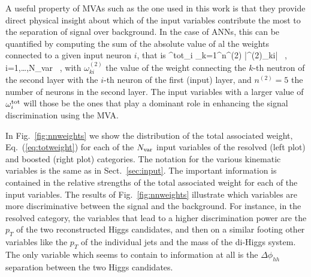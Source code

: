 A useful property of MVAs such as the one used in this work
is that they provide direct  physical insight about which of the
input variables contribute the most to the separation of
signal over background.
%
In the case of ANNs, this can be quantified by computing the sum
of the absolute value of al the weights connected to a given
input neuron $i$, that is
\be
\label{eq:totweight}
\omega^{\rm tot}_i \equiv \sum_{k=1}^{n^{(2)}} \Big|\omega^{(2)}_{ki}\Big| \, ,
\qquad i=1,\ldots,N_{\rm var} \, ,
\ee
with $\omega^{(2)}_{ki}$ the value of the weight connecting
the $k$-th neutron of the second layer with the $i$-th neuron of
the first (input) layer, and $n^{(2)}=5$ the number of
neurons in the second layer.
%
The input variables with a larger value of $\omega^{\rm tot}_i$ will those
be the ones that play a dominant role in enhancing the signal
discrimination using the MVA.

%
In Fig.~\ref{fig:nnweights} we show
the distribution of the total associated weight,
Eq.~(\ref{eq:totweight}) for each of the $N_{\rm var}$ input
variables of the resolved (left plot) and boosted (right plot) categories.
%
The notation for the various kinematic variables is the same
as in Sect.~\ref{sec:input}.
%
The important information
is contained in the relative strengths of the total associated weight
for each of the input variables.
%
The results of Fig.~\ref{fig:nnweights} illustrate which variables
are more discriminative between the signal and the background.
%
For instance, in the 
resolved category, the variables that lead to
a higher discrimination power
are the $p_T$ of the two reconstructed Higgs candidates, and then on a similar
footing other variables like the $p_T$ of the individual jets
and the mass of the di-Higgs system.
%
The only variable which seems to contain to information at all
is the $\Delta \phi_{hh}$ separation between the two
Higgs candidates.


